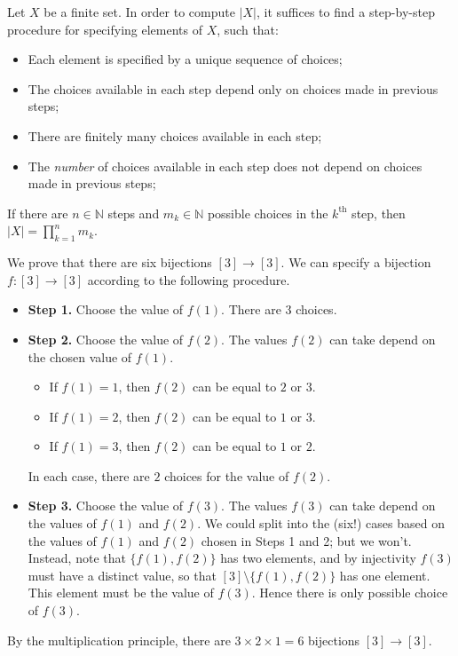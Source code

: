 \begin{strategy}
\label{strMultiplicationPrinciple}
Let $X$ be a finite set. In order to compute $|X|$, it suffices to find a step-by-step procedure for specifying elements of $X$, such that:
\vspace{5pt}
\begin{itemize}
\item Each element is specified by a unique sequence of choices;
\item The choices available in each step depend only on choices made in previous steps;
\item There are finitely many choices available in each step;
\item The \textit{number} of choices available in each step does not depend on choices made in previous steps;
\end{itemize}
\vspace{5pt}
If there are $n \in \mathbb{N}$ steps and $m_k \in \mathbb{N}$ possible choices in the $k^{\text{th}}$ step, then $|X| = \prod_{k=1}^n m_k$.
\end{strategy}

\begin{example}
We prove that there are six bijections $[3] \to [3]$. We can specify a bijection $f : [3] \to [3]$ according to the following procedure.
\begin{itemize}
\item \textbf{Step 1.} Choose the value of $f(1)$. There are $3$ choices.
\item \textbf{Step 2.} Choose the value of $f(2)$. The values $f(2)$ can take depend on the chosen value of $f(1)$.
\begin{itemize}
\item If $f(1)=1$, then $f(2)$ can be equal to $2$ or $3$.
\item If $f(1)=2$, then $f(2)$ can be equal to $1$ or $3$.
\item If $f(1)=3$, then $f(2)$ can be equal to $1$ or $2$.
\end{itemize}
In each case, there are $2$ choices for the value of $f(2)$.
\item \textbf{Step 3.} Choose the value of $f(3)$. The values $f(3)$ can take depend on the values of $f(1)$ and $f(2)$. We could split into the (six!) cases based on the values of $f(1)$ and $f(2)$ chosen in Steps 1 and 2; but we won't. Instead, note that $\{f(1),f(2)\}$ has two elements, and by injectivity $f(3)$ must have a distinct value, so that $[3] \setminus \{ f(1),f(2) \}$ has one element. This element must be the value of $f(3)$. Hence there is only possible choice of $f(3)$.
\end{itemize}
By the multiplication principle, there are $3 \times 2 \times 1 = 6$ bijections $[3] \to [3]$.
\end{example}

